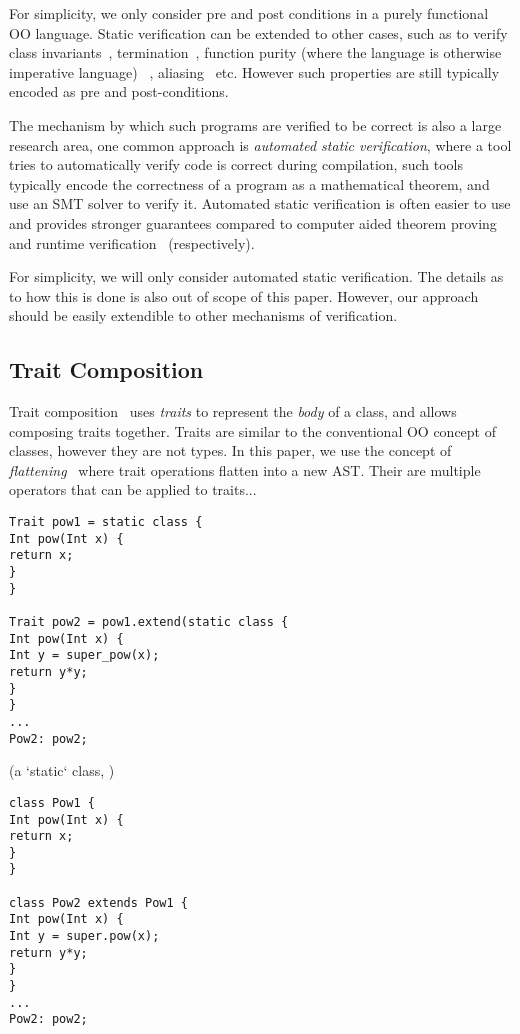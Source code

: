 For simplicity, we only consider pre and post conditions in a purely functional OO language. Static verification can be extended to other cases, such as to verify class invariants~\cite{?}, termination~\cite{?}, function purity (where the language is otherwise imperative language) ~\cite{?}, aliasing~\cite{?} etc. However such properties are still typically encoded as pre and post-conditions.

The mechanism by which such programs are verified to be correct is also a large research area, one common approach is \emph{automated static verification}, where a tool tries to automatically verify code is correct during compilation, such tools typically encode the correctness of a program as a mathematical theorem, and use an SMT solver to verify it. Automated static verification is often easier to use and provides stronger guarantees compared to computer aided theorem proving~\cite{?} and runtime verification~\cite{?} (respectively). 

For simplicity, we will only consider automated static verification. The details as to how this is done is also out of scope of this paper. However, our approach should be easily extendible to other mechanisms of verification.

\subsection{Trait Composition}
Trait composition~\cite{?} uses \emph{traits} to represent the \emph{body} of a class, and allows composing traits together. Traits are similar to the conventional OO concept of classes, however they are not types. In this paper, we use the concept of \emph{flattening}~\cite{?} where trait operations flatten into a new AST. Their are multiple operators that can be applied to traits...

\begin{lstlisting}
Trait pow1 = static class {
Int pow(Int x) {
return x; 
}
}

Trait pow2 = pow1.extend(static class {
Int pow(Int x) {
Int y = super_pow(x);
return y*y;
}
}
...
Pow2: pow2;
\end{lstlisting}

(a `static` class, )

\begin{lstlisting}
class Pow1 {
Int pow(Int x) {
return x; 
}
}

class Pow2 extends Pow1 {
Int pow(Int x) {
Int y = super.pow(x);
return y*y;
}
}
...
Pow2: pow2;
\end{lstlisting}

